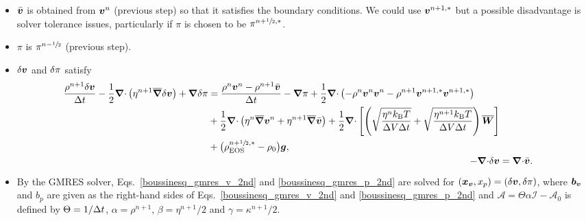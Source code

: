 \documentclass[
10pt
showpacs, showkeys,
amsmath,amssymb,
aps,
pre,
floatfix,
]{revtex4-1}
\newcommand{\divg}{{\V\nabla\cdot}}                       %
\begin{document}
\begin{enumerate}
\begin{itemize}
\item $\bar{\boldsymbol{v}}$ is obtained from $\boldsymbol{v}^n$ (previous step) so that it satisfies the boundary conditions.  We could use $\boldsymbol{v}^{n+1,*}$
but a possible disadvantage is solver tolerance issues, particularly if $\pi$ is chosen to be $\pi^{n+\sfrac{1}{2},*}$.
\item $\pi$ is $\pi^{n-\sfrac{1}{2}}$ (previous step).
\item $\delta\boldsymbol{v}$ and $\delta\pi$ satisfy
\begin{align}
\label{boussinesq_gmres_v_2nd}
\begin{split}
\frac{\rho^{n+1}\d{\V{v}}}{\D{t}} - \frac{1}{2}\divg\left(\eta^{n+1}\overline{\grad}\d{\V{v}}\right) + \grad\d{\pi}
& = \frac{\rho^n\V{v}^n-\rho^{n+1}\bar{\V{v}}}{\D{t}} - \grad\pi 
+ \frac{1}{2}\divg\left(-\rho^n\V{v}^n\V{v}^n-\rho^{n+1}\V{v}^{n+1,*}\V{v}^{n+1,*}\right) \\
& + \frac{1}{2}\divg\left( \eta^n\overline{\grad}\V{v}^n + \eta^{n+1}\overline{\grad}\bar{\V{v}} \right) 
+ \frac{1}{2}\divg\left[\left( \sqrt{\frac{\eta^n k_\mathrm{B}T}{\D{V}\D{t}}} + \sqrt{\frac{\eta^{n+1} k_\mathrm{B}T}{\D{V}\D{t}}} \right) \overline{\V{W}} \right] \\
& + \big(\rho^{n+\myhalf,*}_\mathrm{EOS}-\rho_0\big)\V{g}, 
\end{split} \\
\label{boussinesq_gmres_p_2nd}
-\divg\d{\V{v}} &= \divg\bar{\V{v}}.
\end{align}
\item By the GMRES solver, Eqs.~\eqref{boussinesq_gmres_v_2nd} and \eqref{boussinesq_gmres_p_2nd} are solved for $(\boldsymbol{x}_{\boldsymbol{v}},x_p)=(\delta\boldsymbol{v},\delta\pi)$, where $\boldsymbol{b}_{\boldsymbol{v}}$ and $b_p$ are given as the right-hand sides of Eqs.~\eqref{boussinesq_gmres_v_2nd} and \eqref{boussinesq_gmres_p_2nd} and $\mathcal{A}=\Theta\alpha\mathcal{I}-\mathcal{A}_0$ is defined by $\Theta=1/\Delta t$, $\alpha=\rho^{n+1}$, $\beta=\eta^{n+1}/2$ and $\gamma=\kappa^{n+1}/2$.
\end{itemize}

\end{enumerate}
\end{document}
